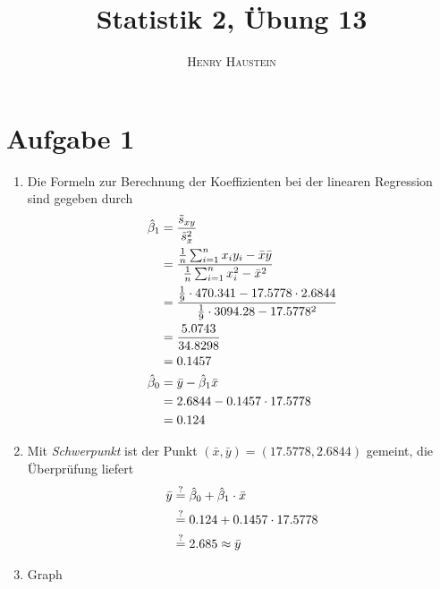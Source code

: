 \documentclass{article}
\title{\textbf{Statistik 2, Übung 13}}
\author{\textsc{Henry Haustein}}
\date{}
\begin{document}
	\maketitle
	
	\section*{Aufgabe 1}
	\begin{enumerate}[label=(\alph*)]
		\item Die Formeln zur Berechnung der Koeffizienten bei der linearen Regression sind gegeben durch
		\begin{align}
			\hat{\beta}_1 &= \frac{\tilde{s}_{xy}}{\tilde{s}_x^2} \notag \\
			&= \frac{\frac{1}{n}\sum_{i=1}^{n} x_iy_i-\bar{x}\bar{y}}{\frac{1}{n}\sum_{i=1}^n x_i^2-\bar{x}^2} \notag \\
			&= \frac{\frac{1}{9}\cdot 470.341 - 17.5778\cdot 2.6844}{\frac{1}{9}\cdot 3094.28- 17.5778^2} \notag \\
			&= \frac{5.0743}{34.8298} \notag \\
			&= 0.1457 \notag \\
			\hat{\beta}_0 &= \bar{y} - \hat{\beta}_1\bar{x} \notag \\
			&= 2.6844-0.1457\cdot 17.5778 \notag \\
			&= 0.124 \notag
		\end{align}
		\item Mit \textit{Schwerpunkt} ist der Punkt $(\bar{x},\bar{y}) = (17.5778,2.6844)$ gemeint, die Überprüfung liefert
		\begin{align}
			\bar{y} &\overset{?}{=} \hat{\beta}_0 + \hat{\beta}_1 \cdot \bar{x} \notag \\
			&\overset{?}{=} 0.124 + 0.1457\cdot 17.5778 \notag \\
			&\overset{?}{=} 2.685 \approx \bar{y} \notag
		\end{align}
		\item Graph
		\begin{center}
\end{center}
\end{enumerate}
\end{document}
